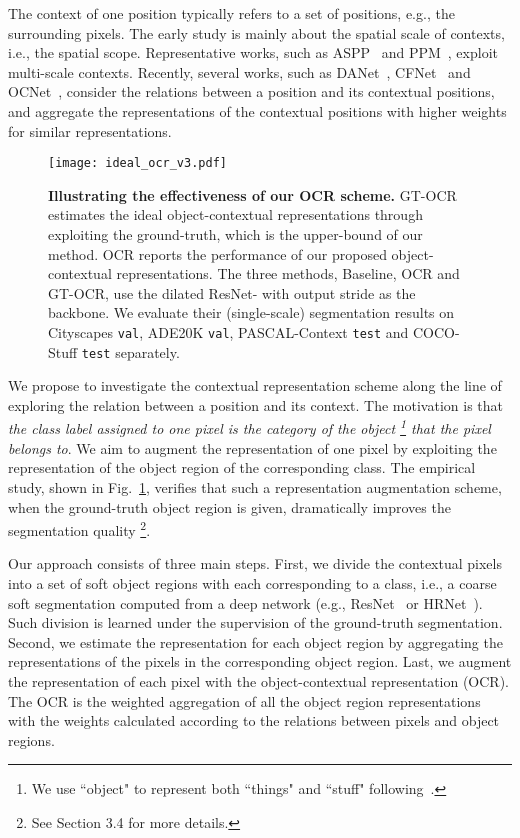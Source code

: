 \documentclass[runningheads]{llncs}
\begin{document}
The context of one position
typically refers to 
a set of positions, e.g., the surrounding pixels.
The early study is mainly about the spatial scale of contexts,
i.e., the spatial scope.
Representative works, such as ASPP~\cite{chen2017rethinking} 
and PPM~\cite{zhao2017pyramid},
exploit multi-scale contexts.
Recently,
several works,
such as DANet~\cite{fu2018dual}, CFNet~\cite{zhang2019co} and OCNet~\cite{yuan2018ocnet,yuan2021},
consider
the relations between
a position and its contextual positions,
and aggregate the representations
of the contextual positions
with higher weights 
for similar representations.

{
\begin{figure}[htb]
\centering
\texttt{[image: ideal\_ocr\_v3.pdf]}
\caption{\small{
\textbf{
Illustrating the effectiveness of our OCR scheme.
}
GT-OCR estimates the ideal object-contextual representations through
exploiting the ground-truth, which is the upper-bound of our method.
OCR reports the performance of our proposed object-contextual representations.
The three methods,
Baseline, OCR and GT-OCR, 
use the dilated ResNet- with output stride 
as the backbone.
We evaluate their
(single-scale) segmentation results on
Cityscapes \texttt{val}, ADE20K \texttt{val}, PASCAL-Context \texttt{test}
and COCO-Stuff \texttt{test} separately.
}}
\label{fig:ideal_ocr}
\end{figure}
}

We propose to investigate the contextual representation scheme
along the line
of exploring the relation
between a position and its context.
The motivation
is that 
\emph{the class label assigned 
to one pixel is the category of the object
\footnote{
We use ``object" to represent
both ``things" and ``stuff" 
following~\cite{farabet2012learning,shetty2019not}.
}
that the pixel belongs to}.
We aim to augment the representation of one pixel by 
exploiting the representation of 
the object region of the corresponding class.
The empirical study,
shown in Fig.~\ref{fig:ideal_ocr},
verifies
that such a representation augmentation scheme,
when the ground-truth object region is given,
dramatically improves 
the segmentation quality
\footnote{See Section 3.4
for more details.}. 


Our approach
consists of three main steps.
First, we divide the contextual pixels
into a set of soft object regions
with each corresponding to a class,
i.e., a coarse soft segmentation computed from a deep network (e.g., ResNet~\cite{he2016deep} or HRNet~\cite{sun2019high}).
Such division is learned under the supervision of the ground-truth segmentation.
Second,
we estimate the representation
for each object region
by aggregating the representations
of the pixels in the corresponding object region.
Last,
we augment
the representation of each pixel
with the object-contextual representation (OCR).
The OCR is the weighted aggregation of all
the object region representations 
with the weights 
calculated according to the relations
between pixels and object regions.
\end{document}
